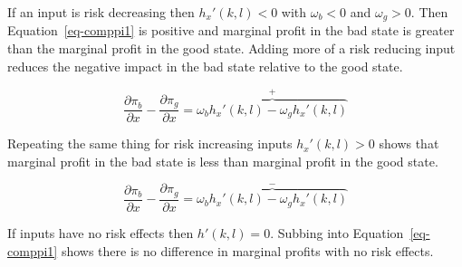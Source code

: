 \documentclass[
  super,
  preprint,
  3p]{elsarticle}
\theoremstyle{plain}
\theoremstyle{plain}
\theoremstyle{remark}
\begin{document}
If an input is risk decreasing then \(h_x'(k,l)<0\) with \(\omega_b<0\)
and \(\omega_g>0\). Then Equation~\ref{eq-comppi1} is positive and
marginal profit in the bad state is greater than the marginal profit in
the good state. Adding more of a risk reducing input reduces the
negative impact in the bad state relative to the good state.

\[
\frac{\partial \pi_b}{\partial x}-\frac{\partial \pi_g}{\partial x}=\overbrace{\omega_bh_x'(k,l)-\omega_gh_x'(k,l)}^{+}
\]

Repeating the same thing for risk increasing inputs \(h_x'(k,l)>0\)
shows that marginal profit in the bad state is less than marginal profit
in the good state.

\[
\frac{\partial \pi_b}{\partial x}-\frac{\partial \pi_g}{\partial x}=\overbrace{\omega_bh_x'(k,l)-\omega_gh_x'(k,l)}^{-}
\]

If inputs have no risk effects then \(h'(k,l)=0\). Subbing into
Equation~\ref{eq-comppi1} shows there is no difference in marginal
profits with no risk effects.


\renewcommand\refname{References}
  
\end{document}

